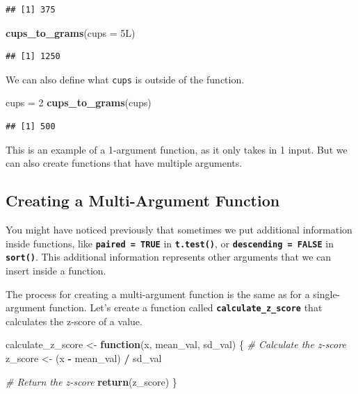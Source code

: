 \documentclass[
]{book}
\newenvironment{Shaded}{\begin{snugshade}}{\end{snugshade}}
\newcommand{\AttributeTok}[1]{\textcolor[rgb]{0.13,0.29,0.53}{#1}}
\newcommand{\CommentTok}[1]{\textcolor[rgb]{0.56,0.35,0.01}{\textit{#1}}}
\newcommand{\ControlFlowTok}[1]{\textcolor[rgb]{0.13,0.29,0.53}{\textbf{#1}}}
\newcommand{\DecValTok}[1]{\textcolor[rgb]{0.00,0.00,0.81}{#1}}
\newcommand{\FunctionTok}[1]{\textcolor[rgb]{0.13,0.29,0.53}{\textbf{#1}}}
\newcommand{\NormalTok}[1]{#1}
\newcommand{\OtherTok}[1]{\textcolor[rgb]{0.56,0.35,0.01}{#1}}
\newcommand{\SpecialCharTok}[1]{\textcolor[rgb]{0.81,0.36,0.00}{\textbf{#1}}}
\begin{document}
\begin{verbatim}
## [1] 375
\end{verbatim}

\begin{Shaded}
\begin{Highlighting}[]
\FunctionTok{cups\_to\_grams}\NormalTok{(}\AttributeTok{cups =}\NormalTok{ 5L)}
\end{Highlighting}
\end{Shaded}

\begin{verbatim}
## [1] 1250
\end{verbatim}

We can also define what \texttt{cups} is outside of the function.

\begin{Shaded}
\begin{Highlighting}[]
\NormalTok{cups }\OtherTok{=} \DecValTok{2}
\FunctionTok{cups\_to\_grams}\NormalTok{(cups)}
\end{Highlighting}
\end{Shaded}

\begin{verbatim}
## [1] 500
\end{verbatim}

This is an example of a 1-argument function, as it only takes in 1 input. But we can also create functions that have multiple arguments.

\hypertarget{creating-a-multi-argument-function}{%
\subsection{Creating a Multi-Argument Function}\label{creating-a-multi-argument-function}}

You might have noticed previously that sometimes we put additional information inside functions, like \textbf{\texttt{paired\ =\ TRUE}} in \textbf{\texttt{t.test()}}, or \textbf{\texttt{descending\ =\ FALSE}} in \textbf{\texttt{sort()}}. This additional information represents other arguments that we can insert inside a function.

The process for creating a multi-argument function is the same as for a single-argument function. Let's create a function called \textbf{\texttt{calculate\_z\_score}} that calculates the z-score of a value.

\begin{Shaded}
\begin{Highlighting}[]
\NormalTok{calculate\_z\_score }\OtherTok{\textless{}{-}} \ControlFlowTok{function}\NormalTok{(x, mean\_val, sd\_val) \{}
  \CommentTok{\# Calculate the z{-}score}
\NormalTok{  z\_score }\OtherTok{\textless{}{-}}\NormalTok{ (x }\SpecialCharTok{{-}}\NormalTok{ mean\_val) }\SpecialCharTok{/}\NormalTok{ sd\_val}
  
  \CommentTok{\# Return the z{-}score}
  \FunctionTok{return}\NormalTok{(z\_score)}
\NormalTok{\}}
\end{Highlighting}
\end{Shaded}
\end{document}
